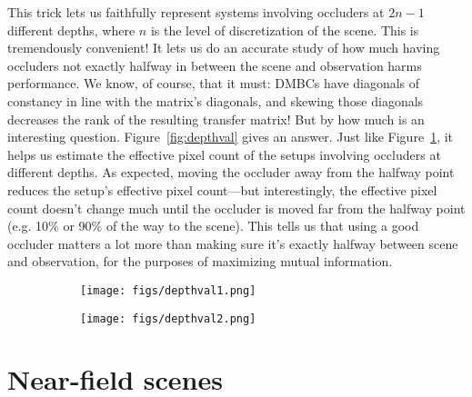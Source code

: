 This trick lets us faithfully represent systems involving occluders at $2n-1$ different depths, where $n$ is the level of discretization of the scene. This is tremendously convenient! It lets us do an accurate study of how much having occluders not exactly halfway in between the scene and observation harms performance. We know, of course, that it must: DMBCs have diagonals of constancy in line with the matrix's diagonals, and skewing those diagonals decreases the rank of the resulting transfer matrix! But by how much is an interesting question. Figure~\ref{fig:depthval} gives an answer. Just like Figure~\ref{fig:optimalpixelcount}, it helps us estimate the effective pixel count of the setups involving occluders at different depths. As expected, moving the occluder away from the halfway point reduces the setup's effective pixel count---but interestingly, the effective pixel count doesn't change much until the occluder is moved far from the halfway point (e.g. 10\% or 90\% of the way to the scene). This tells us that using a good occluder matters a lot more than making sure it's exactly halfway between scene and observation, for the purposes of maximizing mutual information.

\begin{figure}
\centering
\begin{subfigure}[b]{.7\linewidth}
\texttt{[image: figs/depthval1.png]}
\end{subfigure}
\caption{Top: the approximate effective pixel count of scenes generated at different occluder depths. As expected, when the occluder is near the observation plane or the scene, it reduces the number of effective pixels. Here the scene correlation $\beta = 10^{-3}$. Bottom: masks corresponding to each of the effective scene pixel counts. Note that these masks repeat themselves once in each dimension, so each mask is $2n - 1 \times 2n - 1$ if the effective pixel count is $n$. This is due to the phenomenon described in Figure~\ref{fig:depthval}.}
\begin{subfigure}[b]{.7\linewidth}
\texttt{[image: figs/depthval2.png]}
\end{subfigure}
\label{fig:optimalpixelcount}
\end{figure}

\section{Near-field scenes}

